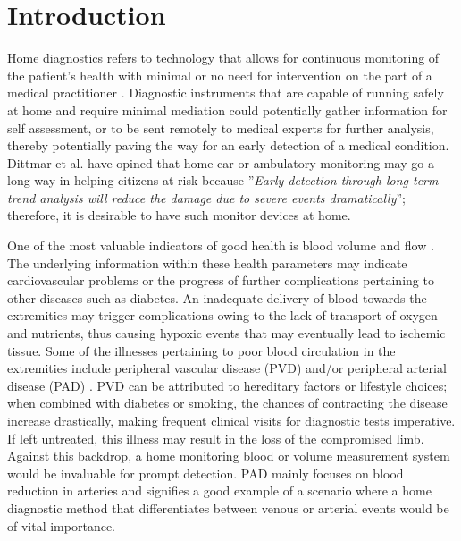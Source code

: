 
\chapter{Introduction}  %

\ifpdf
    \graphicspath{{Chapter1/Figs/Raster/}{Chapter1/Figs/PDF/}{Chapter1/Figs/}}
\else
    \graphicspath{{Chapter1/Figs/Vector/}{Chapter1/Figs/}}
\fi

Home diagnostics refers to technology that allows for continuous monitoring of the patient's health with minimal or no need for intervention on the part of a medical practitioner \cite{dittmar2004new}. Diagnostic instruments that are capable of running safely at home and require minimal mediation could potentially gather information for self assessment, or to be sent remotely to medical experts for further analysis, thereby potentially paving the way for an early detection of a medical condition.  Dittmar et al. \cite{dittmar2004new} have opined that home car or ambulatory monitoring may go a long way in helping citizens at risk because ''\textit{Early detection through long-term trend analysis will reduce the damage due to severe events dramatically}''; therefore, it is desirable to have such monitor devices at home.

One of the most valuable indicators of good health is blood volume and flow \cite{bloodcirculation}. The underlying information within these health parameters may indicate cardiovascular problems or the progress of further complications pertaining to other diseases such as diabetes. An inadequate delivery of blood towards the extremities may trigger complications owing to the lack of transport of oxygen and nutrients, thus causing hypoxic events that may eventually lead to ischemic tissue. Some of the illnesses pertaining to poor blood circulation in the extremities include peripheral vascular disease (PVD) and/or peripheral arterial disease (PAD) \cite{novo2004critical}. PVD can be attributed to hereditary factors or lifestyle choices; when combined with diabetes or smoking, the chances of contracting the disease increase drastically, making frequent clinical visits for diagnostic tests imperative. If left untreated, this illness may result in the loss of the compromised limb. Against this backdrop, a home monitoring blood or volume measurement system would be invaluable for prompt detection. PAD mainly focuses on blood reduction in arteries and signifies a good example of a scenario where a home diagnostic method that differentiates between venous or arterial events would be of vital importance. 

